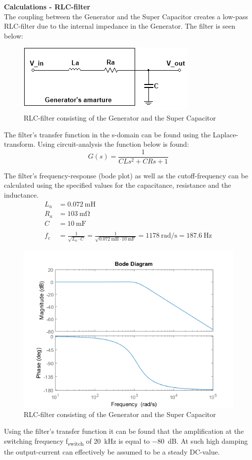 \textbf{Calculations - RLC-filter}\\
The coupling between the Generator and the Super Capacitor creates a low-pass RLC-filter due to the internal impedance in the Generator. The filter is seen below:

\begin{figure}[H]
	\centering
	\includegraphics[width=0.5\linewidth]{Hardware/LoadSystem/RLC_filter}
	\caption{RLC-filter consisting of the Generator and the Super Capacitor}
	\label{fig:RLC_filter}
\end{figure}

The filter's transfer function in the s-domain can be found using the Laplace-transform. Using circuit-analysis the function below is found: 
\begin{equation}
	G(s) = \frac{1}{CLs^2 + CRs + 1}
\end{equation}

 The filter's frequency-response (bode plot) as well as the cutoff-frequency can be calculated using the specified values for the capacitance, resistance and the inductance.
\begin{equation}
	\begin{split}
		L_a &= \SI{0.072}{\milli \henry}\\
		R_a &= \SI{103}{\milli \ohm}\\
		C &= \SI{10}{\milli \farad}\\
		\\
		f_c &= \frac{1}{\sqrt{L_a \cdot C}} = \frac{1}{\sqrt{\SI{0.072}{\milli \henry} \cdot \SI{10}{\milli \farad}}} = \SI[per-mode=fraction]{1178}{\radian \per \second} = \SI{187.6}{\hertz}
	\end{split}
\end{equation}

\begin{figure}[H]
	\centering
	\includegraphics[width=0.7\linewidth]{Hardware/LoadSystem/BodeFilter}
	\caption{RLC-filter consisting of the Generator and the Super Capacitor}
	\label{fig:RLC_filter}
\end{figure}

Using the filter's transfer function it can be found that the amplification at the switching frequency f\textsubscript{switch} of \SI{20}{\kilo \hertz} is equal to \SI{-80}{dB}. At such high damping the output-current can effectively be assumed to be a steady DC-value.